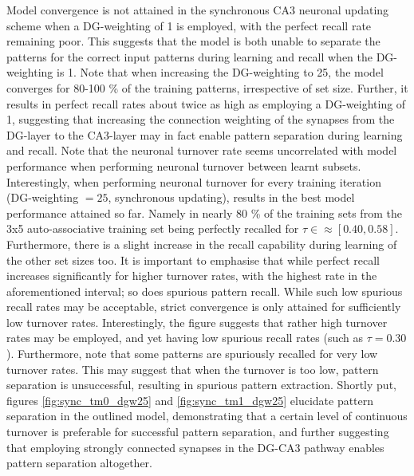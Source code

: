 Model convergence is not attained in the synchronous CA3 neuronal updating scheme when a DG-weighting of 1 is employed, with the perfect recall rate remaining poor. This suggests that the model is both unable to separate the patterns for the correct input patterns during learning and recall when the DG-weighting is 1.
Note that when increasing the DG-weighting to 25, the model converges for 80-100 \% of the training patterns, irrespective of set size. Further, it results in perfect recall rates about twice as high as employing a DG-weighting of 1, suggesting that increasing the connection weighting of the synapses from the DG-layer to the CA3-layer may in fact enable pattern separation during learning and recall.
Note that the neuronal turnover rate seems uncorrelated with model performance when performing neuronal turnover between learnt subsets. Interestingly, when performing neuronal turnover for every training iteration (DG-weighting $= 25$, synchronous updating), results in the best model performance attained so far. Namely in  nearly 80 \% of the training sets from the 3x5 auto-associative training set being perfectly recalled for $\tau\in\approx[0.40, 0.58]$.
Furthermore, there is a slight increase in the recall capability during learning of the other set sizes too. It is important to emphasise that while perfect recall increases significantly for higher turnover rates, with the highest rate in the aforementioned interval; so does spurious pattern recall. While such low spurious recall rates may be acceptable, strict convergence is only attained for sufficiently low turnover rates. Interestingly, the figure suggests that rather high turnover rates may be employed, and yet having low spurious recall rates (such as $\tau=0.30$). Furthermore, note that some patterns are spuriously recalled for very low turnover rates. This may suggest that when the turnover is too low, pattern separation is unsuccessful, resulting in spurious pattern extraction.
Shortly put, figures \ref{fig:sync_tm0_dgw25} and \ref{fig:sync_tm1_dgw25} elucidate pattern separation in the outlined model, demonstrating that a certain level of continuous turnover is preferable for successful pattern separation, and further suggesting that employing strongly connected synapses in the DG-CA3 pathway enables pattern separation altogether.

